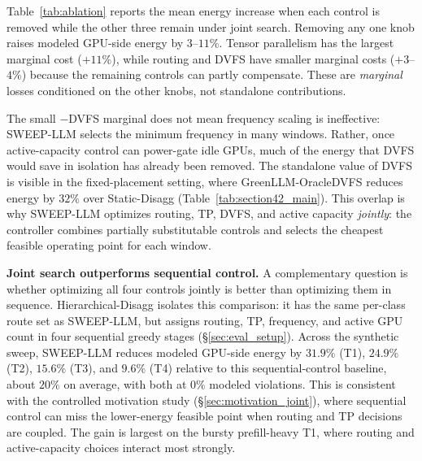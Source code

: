 Table~\ref{tab:ablation} reports the mean energy increase when each control is removed while the other three remain under joint search.
Removing any one knob raises modeled GPU-side energy by $3$--$11\%$.
Tensor parallelism has the largest marginal cost ($+11\%$), while routing and DVFS have smaller marginal costs ($+3$--$4\%$) because the remaining controls can partly compensate.
These are \emph{marginal} losses conditioned on the other knobs, not standalone contributions.

The small $-$DVFS marginal does not mean frequency scaling is ineffective: SWEEP-LLM selects the minimum frequency in many windows.
Rather, once active-capacity control can power-gate idle GPUs, much of the energy that DVFS would save in isolation has already been removed.
The standalone value of DVFS is visible in the fixed-placement setting, where GreenLLM-OracleDVFS reduces energy by $32\%$ over Static-Disagg (Table~\ref{tab:section42_main}).
This overlap is why SWEEP-LLM optimizes routing, TP, DVFS, and active capacity \emph{jointly}: the controller combines partially substitutable controls and selects the cheapest feasible operating point for each window.

\textbf{Joint search outperforms sequential control.}
A complementary question is whether optimizing all four controls jointly is better than optimizing them in sequence.
Hierarchical-Disagg isolates this comparison: it has the same per-class route set as SWEEP-LLM, but assigns routing, TP, frequency, and active GPU count in four sequential greedy stages (\S\ref{sec:eval_setup}).
Across the synthetic sweep, SWEEP-LLM reduces modeled GPU-side energy by $31.9\%$ (T1), $24.9\%$ (T2), $15.6\%$ (T3), and $9.6\%$ (T4) relative to this sequential-control baseline, about $20\%$ on average, with both at $0\%$ modeled violations.
This is consistent with the controlled motivation study (\S\ref{sec:motivation_joint}), where sequential control can miss the lower-energy feasible point when routing and TP decisions are coupled.
The gain is largest on the bursty prefill-heavy T1, where routing and active-capacity choices interact most strongly.

